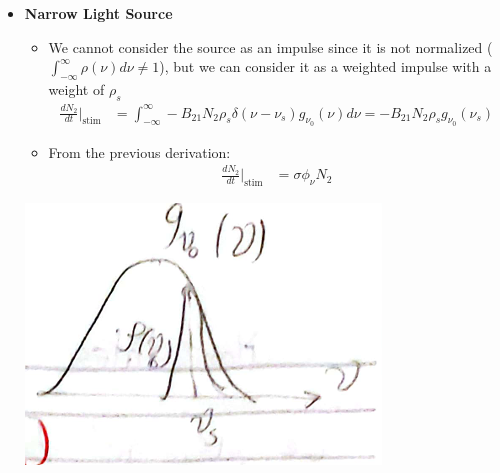 \documentclass[11pt]{article}
\begin{document}
\begin{itemize}
    \item \textbf{Narrow Light Source}
        \begin{itemize}
            \item We cannot consider the source as an impulse since it is not normalized ($\int_{-\infty}^{\infty} \rho(\nu) d\nu \not= 1$), but we can consider it as a weighted impulse with a weight of $\rho_s$
            \begin{align*}
                \frac{dN_2}{dt} \bigg|_{\text{stim}} &= \int_{-\infty}^{\infty} -B_{21} N_2 \rho_s \delta(\nu - \nu_s) g_{\nu_0}(\nu) d\nu = -B_{21} N_2 \rho_s g_{\nu_0}(\nu_s)
            \end{align*}
            \item From the previous derivation:
            \begin{align*}
                \frac{dN_2}{dt} \bigg|_{\text{stim}} &= \sigma \phi_{\nu} N_2
            \end{align*}
        \end{itemize}
        \begin{center}
            \includegraphics[scale=0.8]{6.png}
        \end{center}
\end{itemize}
\end{document}
